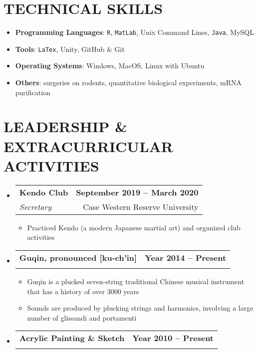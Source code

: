 \documentclass[letterpaper,11pt]{article}
\makeatletter
\newcommand{\resumeItem}[1]{
	\item\small{
		{#1 \vspace{0pt}}
	}
}
\newcommand{\resumeSubheading}[4]{
	\vspace{-2pt}\item
	\begin{tabular*}{1.0\textwidth}[t]{l@{\extracolsep{\fill}}r}
		\textbf{#1} & \textbf{\small #2} \\
		\textit{\small#3} & {\small #4} \\
	\end{tabular*}\vspace{-4pt}
}
\newcommand{\resumeSubHeadingListStart}{\begin{itemize}[leftmargin=0.0in, label={}]}
\newcommand{\resumeSubHeadingListEnd}{\end{itemize}}
\newcommand{\resumeItemListStart}{\begin{itemize}}
\newcommand{\resumeItemListEnd}{\end{itemize}\vspace{-5pt}}
\makeatother
\begin{document}
	\section{TECHNICAL SKILLS}
		\begin{itemize}[itemsep=-2pt, parsep=5pt]
			\item \textbf{Programming Languages}: \texttt{R}, \texttt{MatLab}, Unix Command Lines, \texttt{Java}, MySQL
			\item \textbf{Tools}: \texttt{LaTex}, Unity, GitHub \& Git
			\item \textbf{Operating Systems}: Windows, MacOS, Linux with Ubuntu
			\item \textbf{Others}: surgeries on rodents, quantitative biological experiments, mRNA purification
		\end{itemize}
	\vspace*{2.0\multicolsep}
	
	\section{LEADERSHIP \& EXTRACURRICULAR ACTIVITIES}
	\resumeSubHeadingListStart
	\resumeSubheading{Kendo Club}{September 2019 -- March 2020}{Secretary}{Case Western Reserve University}
	\resumeItemListStart
	\resumeItem{Practiced Kendo (a modern Japanese martial art) and organized club activities}
	\resumeItemListEnd 
	\vspace{-5px}
	
	\resumeSubheading{Guqin, pronounced [ku-ch'in]}{Year 2014 -- Present}{}{} \vspace{-20px}
	\resumeItemListStart
	\resumeItem{Guqin is a plucked seven-string traditional Chinese musical instrument that has a history of over 3000 years}
	\resumeItem{Sounds are produced by plucking strings and harmonics, involving a large number of glissandi and portamenti}
	\resumeItemListEnd
	\vspace{-5px}
	
	\resumeSubheading{Acrylic Painting \& Sketch}{Year 2010 -- Present}{}{} \vspace{-25px}
	
	\resumeSubHeadingListEnd
	
\end{document}
